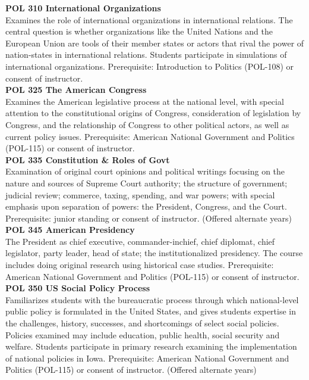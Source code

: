 \documentclass[
  letterpaper,
]{scrbook}
\begin{document}
\textbf{POL 310 International Organizations}\\
Examines the role of international organizations in international
relations. The central question is whether organizations like the United
Nations and the European Union are tools of their member states or
actors that rival the power of nation-states in international relations.
Students participate in simulations of international organizations.
Prerequisite: Introduction to Politics (POL-108) or consent of
instructor.\\
\textbf{POL 325 The American Congress}\\
Examines the American legislative process at the national level, with
special attention to the constitutional origins of Congress,
consideration of legislation by Congress, and the relationship of
Congress to other political actors, as well as current policy issues.
Prerequisite: American National Government and Politics (POL-115) or
consent of instructor.\\
\textbf{POL 335 Constitution \& Roles of Govt}\\
Examination of original court opinions and political writings focusing
on the nature and sources of Supreme Court authority; the structure of
government; judicial review; commerce, taxing, spending, and war powers;
with special emphasis upon separation of powers: the President,
Congress, and the Court. Prerequisite: junior standing or consent of
instructor. (Offered alternate years)\\
\textbf{POL 345 American Presidency}\\
The President as chief executive, commander-inchief, chief diplomat,
chief legislator, party leader, head of state; the institutionalized
presidency. The course includes doing original research using historical
case studies. Prerequisite: American National Government and Politics
(POL-115) or consent of instructor.\\
\textbf{POL 350 US Social Policy Process}\\
Familiarizes students with the bureaucratic process through which
national-level public policy is formulated in the United States, and
gives students expertise in the challenges, history, successes, and
shortcomings of select social policies. Policies examined may include
education, public health, social security and welfare. Students
participate in primary research examining the implementation of national
policies in Iowa. Prerequisite: American National Government and
Politics (POL-115) or consent of instructor. (Offered alternate years)\\
\end{document}
